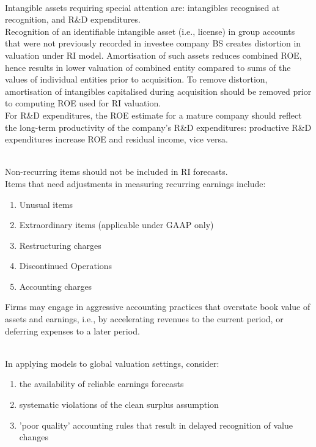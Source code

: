 \begin{remark} \\
Intangible assets requiring special attention are: intangibles recognised at recognition, and R\&D expenditures.\\
Recognition of an identifiable intangible asset (i.e., license) in group accounts that were not previously recorded in investee company BS creates distortion in valuation under RI model. Amortisation of such assets reduces combined ROE, hence results in lower valuation of combined entity compared to sums of the values of individual entities prior to acquisition. To remove distortion, amortisation of intangibles capitalised during acquisition should be removed prior to computing ROE used for RI valuation.\\
For R\&D expenditures, the ROE estimate for a mature company should reflect the long-term productivity of the company's R\&D expenditures: productive R\&D expenditures increase ROE and residual income, vice versa.
\end{remark}

\begin{remark} \\
Non-recurring items should not be included in RI forecasts.\\
Items that need adjustments in measuring recurring earnings include:
\begin{enumerate}[label=\roman*.]
\setlength{\itemsep}{0pt}
\item Unusual items
\item Extraordinary items (applicable under GAAP only)
\item Restructuring charges
\item Discontinued Operations
\item Accounting charges
\end{enumerate}
Firms may engage in aggressive accounting practices that overstate book value of assets and earnings, i.e., by accelerating revenues to the current period, or deferring expenses to a later period.
\end{remark}

\begin{remark} \\
In applying models to global valuation settings, consider:
\begin{enumerate}[label=\roman*.]
\setlength{\itemsep}{0pt}
\item the availability of reliable earnings forecasts
\item systematic violations of the clean surplus assumption
\item 'poor quality' accounting rules that result in delayed recognition of value changes
\end{enumerate}
\end{remark}

